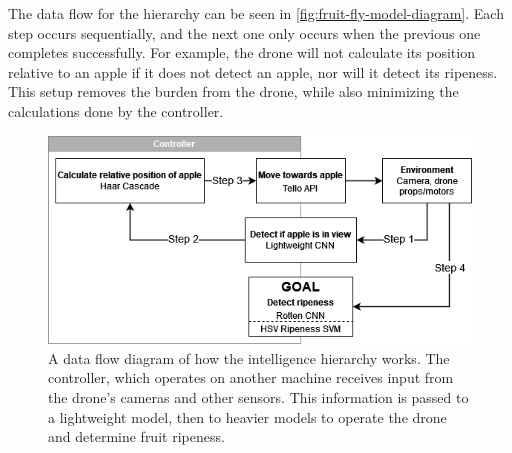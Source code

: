 The data flow for the hierarchy can be seen in \autoref{fig:fruit-fly-model-diagram}.
Each step occurs sequentially, and the next one only occurs when the previous one
completes successfully.
For example, the drone will not calculate its position relative to an apple if it
does not detect an apple, nor will it detect its ripeness.
This setup removes the burden from the drone, while also minimizing the calculations
done by the controller.

\begin{figure}[!htb]
    \fontsize{7}{5}\selectfont
    \centering
    \includegraphics[width=\columnwidth,keepaspectratio]
    {./figures/fruit-fly-model-diagram}
    \caption{
        A data flow diagram of how the intelligence hierarchy works.
        The controller, which operates on another machine receives input from the
        drone's cameras and other sensors.
        This information is passed to a lightweight model, then to heavier models to
        operate the drone and determine fruit ripeness.
    }
    \label{fig:fruit-fly-model-diagram}
\end{figure}

